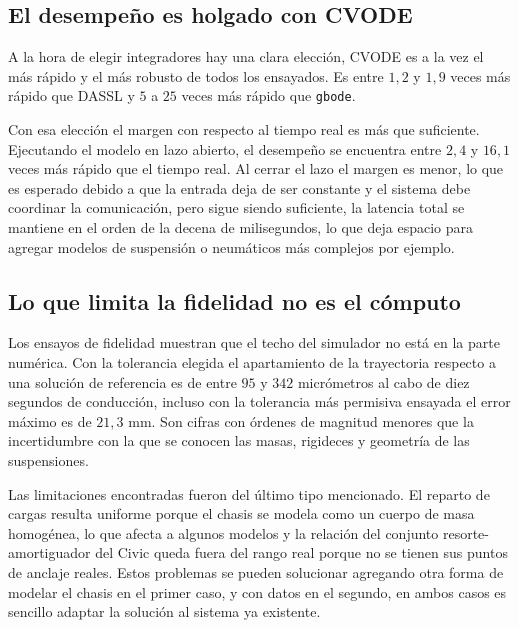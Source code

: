 \subsection*{El desempeño es holgado con CVODE}

A la hora de elegir integradores hay una clara elección, CVODE es a la vez el más rápido y el más robusto de todos los ensayados. Es entre $1{,}2$ y $1{,}9$ veces más rápido que DASSL y $5$ a $25$ veces más rápido que \verb|gbode|.

Con esa elección el margen con respecto al tiempo real es más que suficiente. Ejecutando el modelo en lazo abierto, el desempeño se encuentra entre $2{,}4$ y $16{,}1$ veces más rápido que el tiempo real. Al cerrar el lazo el margen es menor, lo que es esperado debido a que la entrada deja de ser constante y el sistema debe coordinar la comunicación, pero sigue siendo suficiente, la latencia total se mantiene en el orden de la decena de milisegundos, lo que deja espacio para agregar modelos de suspensión o neumáticos más complejos por ejemplo.



\subsection*{Lo que limita la fidelidad no es el cómputo}

Los ensayos de fidelidad muestran que el techo del simulador no está en la parte numérica. Con la tolerancia elegida el apartamiento de la trayectoria respecto a una solución de referencia es de entre $95$ y $342$ micrómetros al cabo de diez segundos de conducción, incluso con la tolerancia más permisiva ensayada el error máximo es de $21{,}3$ mm. Son cifras con órdenes de magnitud menores que la incertidumbre con la que se conocen las masas, rigideces y geometría de las suspensiones.

Las limitaciones encontradas fueron del último tipo mencionado. El reparto de cargas resulta uniforme porque el chasis se modela como un cuerpo de masa homogénea, lo que afecta a algunos modelos y la relación del conjunto resorte-amortiguador del Civic queda fuera del rango real porque no se tienen sus puntos de anclaje reales. Estos problemas se pueden solucionar agregando otra forma de modelar el chasis en el primer caso, y con datos en el segundo, en ambos casos es sencillo adaptar la solución al sistema ya existente.



